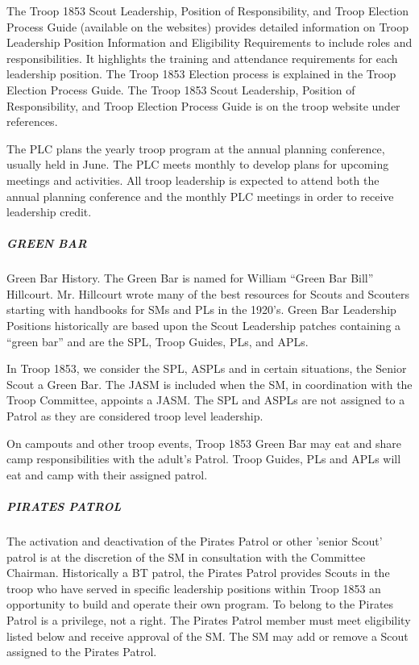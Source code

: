 \documentclass{ltxguide}
\begin{document}
The Troop 1853 Scout Leadership, Position of Responsibility, and Troop Election
Process Guide (available on the websites) provides detailed information on Troop Leadership Position Information and Eligibility Requirements to include roles and responsibilities. It highlights the training and attendance requirements for each leadership position. The Troop 1853 Election process is explained in the Troop Election Process Guide. The Troop 1853 Scout Leadership, Position of Responsibility, and Troop Election Process Guide is on the troop website under references.

The \ac{PLC} plans the yearly troop program at the annual planning conference,  usually held in June. The \ac{PLC} meets monthly to develop plans for upcoming meetings and activities. All troop leadership is expected to attend both the annual planning conference and the monthly \ac{PLC} meetings in order to receive leadership credit.

\subparagraph{GREEN BAR}
Green Bar History. The Green Bar is named for William “Green Bar Bill” Hillcourt. Mr. Hillcourt wrote many of the best resources for Scouts and Scouters starting with handbooks for \acp{SM} and \acp{PL} in the 1920's. Green Bar Leadership Positions historically are based upon the Scout Leadership patches containing a “green bar” and are the \ac{SPL}, Troop Guides, \acp{PL}, and \ac{APL}s.

In Troop 1853, we consider the \ac{SPL}, \acp{ASPL} and in certain situations, the Senior Scout a Green Bar. The \ac{JASM} is included when the \ac{SM}, in coordination with the Troop Committee, appoints a \ac{JASM}. The \ac{SPL} and \acp{ASPL} are not assigned to a Patrol as they are considered troop level leadership.

On campouts and other troop events, Troop 1853 Green Bar may eat and share camp responsibilities with the adult's Patrol. Troop Guides, \acp{PL} and \ac{APL}s will eat and camp with their assigned patrol.

\subparagraph{PIRATES PATROL}
The activation and deactivation of the Pirates Patrol or other 'senior Scout' patrol is at the discretion of the \ac{SM} in consultation with the Committee Chairman.
Historically a \ac{BT} patrol, the Pirates Patrol provides Scouts in the troop who have served in specific leadership positions within Troop 1853 an opportunity to build and operate their own program. To belong to the Pirates Patrol is a privilege, not a right. The Pirates Patrol member must meet eligibility listed below and receive approval of the \ac{SM}. The \ac{SM} may add or remove a Scout assigned to the Pirates Patrol. 
\end{document}
